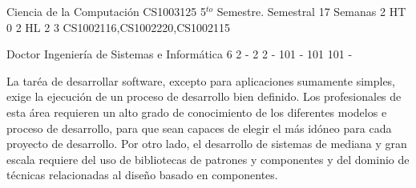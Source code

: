 \documentclass[a4paper,8pt]{article}
\begin{document}
\setNombreProfesor{}
\setGradoProfesorAbreviado{}
\sylabusHeader

\academicaTable
{Ciencia de la Computación} %
{CS1003125} %
{5$^{to}$ Semestre.} %
{Semestral} %
{17 Semanas} %
{2 HT} %
{} %
{0} %
{2 HL}  %
{2} %
{3} %
{CS1002116,CS1002220,CS1002115} %

\administrativaTable
{Doctor} %
{Ingeniería de Sistemas e Informática} %
{6} %
{2} %
{-} %
{2} %
{2} %
{-} %
{101} %
{-} %
{101} %
{101} %
{-} %


\begin{fundamentacion}
La taréa de desarrollar software, excepto para aplicaciones sumamente simples, exige la ejecución de un proceso de desarrollo bien definido. 
Los profesionales de esta área requieren un alto grado de conocimiento de los diferentes modelos e proceso de desarrollo, 
para que sean capaces de elegir el más idóneo para cada proyecto de desarrollo. Por otro lado, el desarrollo de sistemas 
de mediana y gran escala requiere del uso de bibliotecas de patrones y componentes y del dominio de técnicas relacionadas al 
diseño basado en componentes.

\end{fundamentacion}

\begin{sumilla}
\item \SERequirementsEngineering
\item \SESoftwareDesign
\item \SESoftwareConstruction

\end{sumilla}

\begin{competenciasAsignatura}
\item {}
\item {}
\item {}
\item {}
\item {}
\item {}

\end{competenciasAsignatura}
\end{document}

